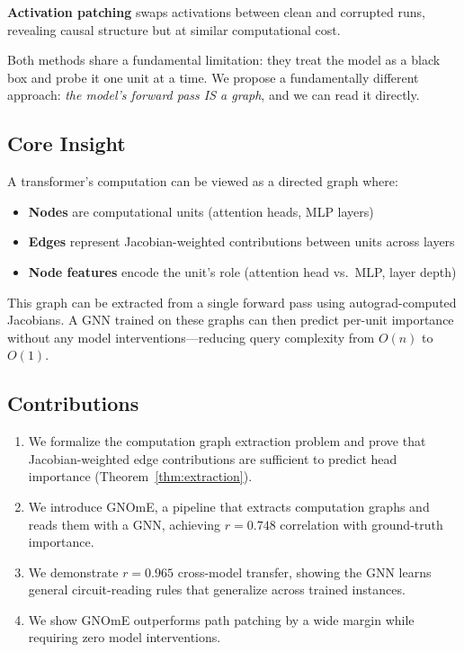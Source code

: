 \documentclass[11pt]{article}
\begin{document}
\textbf{Activation patching} \citep{geiger2021causal} swaps activations between clean and corrupted runs, revealing causal structure but at similar computational cost.

Both methods share a fundamental limitation: they treat the model as a black box and probe it one unit at a time. We propose a fundamentally different approach: \emph{the model's forward pass IS a graph}, and we can read it directly.

\subsection{Core Insight}

A transformer's computation can be viewed as a directed graph where:
\begin{itemize}
    \item \textbf{Nodes} are computational units (attention heads, MLP layers)
    \item \textbf{Edges} represent Jacobian-weighted contributions between units across layers
    \item \textbf{Node features} encode the unit's role (attention head vs.\ MLP, layer depth)
\end{itemize}

This graph can be extracted from a single forward pass using autograd-computed Jacobians. A GNN trained on these graphs can then predict per-unit importance without any model interventions---reducing query complexity from $O(n)$ to $O(1)$.

\subsection{Contributions}

\begin{enumerate}
    \item We formalize the computation graph extraction problem and prove that Jacobian-weighted edge contributions are sufficient to predict head importance (Theorem~\ref{thm:extraction}).
    \item We introduce GNOmE, a pipeline that extracts computation graphs and reads them with a GNN, achieving $r = 0.748$ correlation with ground-truth importance.
    \item We demonstrate $r = 0.965$ cross-model transfer, showing the GNN learns general circuit-reading rules that generalize across trained instances.
    \item We show GNOmE outperforms path patching by a wide margin while requiring zero model interventions.
\end{enumerate}
\end{document}
